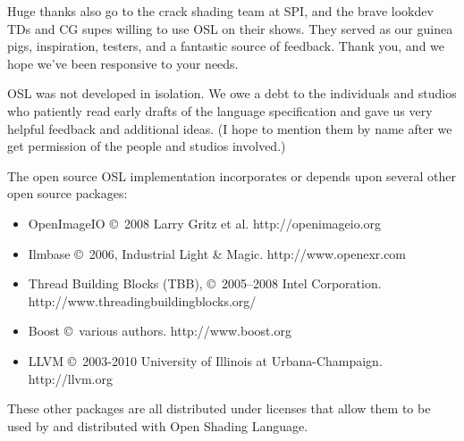\documentclass[11pt,letterpaper]{book}
\def\product{{\sffamily Open Shading Language}\xspace}
\begin{document}
Huge thanks also go to the crack shading team at SPI, and the brave
lookdev TDs and CG supes willing to use OSL on their shows.  They served
as our guinea pigs, inspiration, testers, and a fantastic source of
feedback.  Thank you, and we hope we've been responsive to your needs.

OSL was not developed in isolation.  We owe a debt to the individuals
and studios who patiently read early drafts of the language
specification and gave us very helpful feedback and additional ideas.
(I hope to mention them by name after we get permission of the people
and studios involved.)

\bigskip 
The open source OSL implementation incorporates or depends upon several
other open source packages:

\begin{itemize}
\item {\cf OpenImageIO} \copyright\ 2008 Larry Gritz et al.  
{\cf http://openimageio.org}
\item Ilmbase \copyright\ 2006, Industrial Light \& Magic.
{\cf http://www.openexr.com}
\item Thread Building Blocks (TBB), \copyright\ 2005--2008 Intel Corporation.\\
{\cf http://www.threadingbuildingblocks.org/}
\item Boost \copyright\ various authors.  {\cf http://www.boost.org}
\item LLVM \copyright\ 2003-2010 University of Illinois at
  Urbana-Champaign. {\cf http://llvm.org}
\end{itemize}

These other packages are all distributed under licenses that allow them
to be used by and distributed with \product.

\bigskip

%
% 
\end{document}
